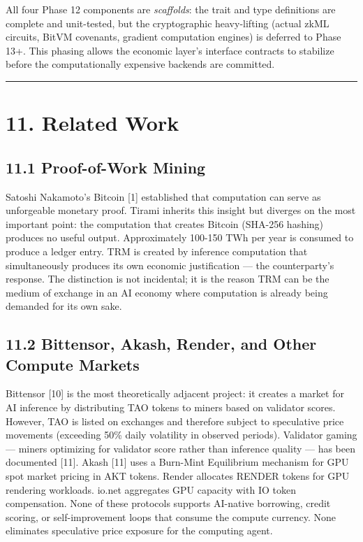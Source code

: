 \documentclass[
  11pt,
]{article}
\begin{document}
All four Phase 12 components are \emph{scaffolds}: the trait and type
definitions are complete and unit-tested, but the cryptographic
heavy-lifting (actual zkML circuits, BitVM covenants, gradient
computation engines) is deferred to Phase 13+. This phasing allows the
economic layer's interface contracts to stabilize before the
computationally expensive backends are committed.

\begin{center}\rule{0.5\linewidth}{0.5pt}\end{center}

\section{11. Related Work}\label{related-work}

\subsection{11.1 Proof-of-Work Mining}\label{proof-of-work-mining}

Satoshi Nakamoto's Bitcoin {[}1{]} established that computation can
serve as unforgeable monetary proof. Tirami inherits this insight but
diverges on the most important point: the computation that creates
Bitcoin (SHA-256 hashing) produces no useful output. Approximately
100-150 TWh per year is consumed to produce a ledger entry. TRM is
created by inference computation that simultaneously produces its own
economic justification --- the counterparty's response. The distinction
is not incidental; it is the reason TRM can be the medium of exchange in
an AI economy where computation is already being demanded for its own
sake.

\subsection{11.2 Bittensor, Akash, Render, and Other Compute
Markets}\label{bittensor-akash-render-and-other-compute-markets}

Bittensor {[}10{]} is the most theoretically adjacent project: it
creates a market for AI inference by distributing TAO tokens to miners
based on validator scores. However, TAO is listed on exchanges and
therefore subject to speculative price movements (exceeding 50\% daily
volatility in observed periods). Validator gaming --- miners optimizing
for validator score rather than inference quality --- has been
documented {[}11{]}. Akash {[}11{]} uses a Burn-Mint Equilibrium
mechanism for GPU spot market pricing in AKT tokens. Render allocates
RENDER tokens for GPU rendering workloads. io.net aggregates GPU
capacity with IO token compensation. None of these protocols supports
AI-native borrowing, credit scoring, or self-improvement loops that
consume the compute currency. None eliminates speculative price exposure
for the computing agent.
\end{document}
